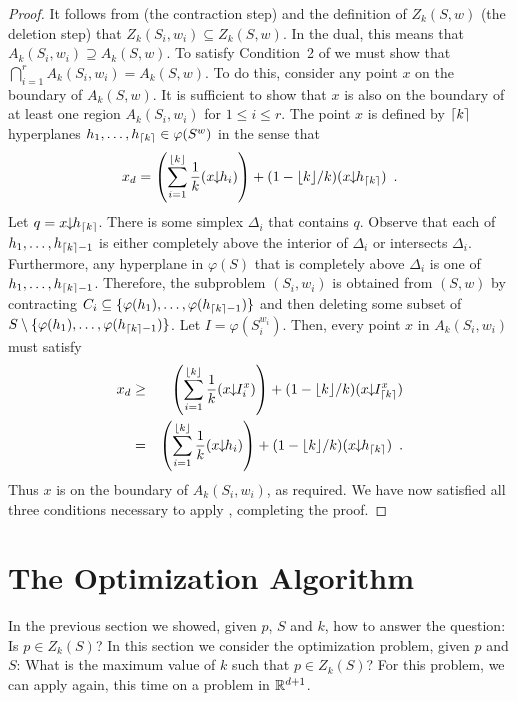 \documentclass[lotsofwhite]{patmorin}
\newcommand{\drop}{\!\!\downarrow\!\!}
\newcommand{\dual}{\varphi}
\begin{document}
\begin{proof}
It follows from  (the contraction step) 
and the definition of $Z_k(S,w)$ (the deletion step)
that $Z_k(S_i,{w_i})\subseteq Z_k(S,w)$.  In the dual, this means that
$A_k(S_i,{w_i})\supseteq A_k(S,w)$.  To satisfy Condition~2 of
 we must
show that $\bigcap_{i=1}^r A_k(S_i,{w_i}) = A_k(S,w)$.  To do this,
consider any point $x$ on the boundary of $A_k(S,w)$.  It is
sufficient to show that $x$ is also on the boundary of at least one
region $A_k(S_i,{w_i})$ for $1\le i\le r$.  The point $x$ is defined
by $\left\lceil k \right\rceil$ hyperplanes $h_1,\ldots,h_{\ceil{k}}\in\dual(S^w)$ in
the sense that 
\[
   x_d=\left(\sum_{i=1}^{\floor{k}} \frac{1}{k}(x\drop h_i)\right) 
       + (1-\lfloor k\rfloor/k)(x\drop h_{\ceil{k}}) \enspace .
\]
Let $q=x\drop h_{\ceil{k}}$.  There
is some simplex $\Delta_i$ that contains $q$.  Observe that
each of $h_1,\ldots,h_{\left\lceil k \right\rceil-1}$ is either completely above
the interior of $\Delta_i$ or intersects $\Delta_i$.  Furthermore, 
any hyperplane in
$\dual(S)$ that is completely above $\Delta_i$ is one of
$h_1,\ldots,h_{\left\lceil k \right\rceil-1}$.  Therefore, the subproblem $(S_i,w_i)$
is obtained from $(S,w)$ by contracting
$C_i\subseteq\{\dual(h_1),\ldots,\dual(h_{\ceil{k}-1})\}$ and then deleting 
some subset of
$S\setminus\{\dual(h_1),\ldots,\dual(h_{\ceil{k}-1})\}$.  Let
$I=\dual(S_i^{w_i})$.  Then, every point $x$ in $A_k(S_i,w_i)$ must
satisfy
\begin{eqnarray*}
  x_d & \ge & \left(\sum_{i=1}^{\floor{k}} \frac{1}{k}(x\drop I_i^x)\right) 
       + (1-\lfloor k\rfloor/k)(x\drop I_{\ceil{k}}^x) \\
   & = & \left(\sum_{i=1}^{\floor{k}} \frac{1}{k}(x\drop h_i)\right) 
       + (1-\lfloor k\rfloor/k)(x\drop h_{\ceil{k}}) \enspace .
\end{eqnarray*}
Thus $x$ is on the boundary of $A_k(S_i,w_i)$, as required.  We have
now satisfied all three conditions necessary to apply ,
completing the proof.
\end{proof}

\section{The Optimization Algorithm}

In the previous section we showed, given $p$, $S$ and $k$, how to
answer the question:  Is $p\in Z_k(S)$?  In this section we consider
the optimization problem, given $p$ and $S$: What is the maximum value
of $k$ such that $p\in Z_k(S)$?  For this problem, we can apply
 again, this time on a problem in $\mathbb{R}^{d+1}$.
\end{document}
